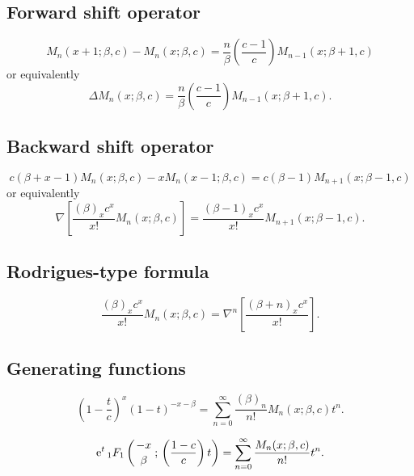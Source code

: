\documentclass[envcountchap,graybox]{svmono}
\newcommand{\hyp}[5]{\mbox{}_{#1}{F}_{#2}
\left(\genfrac{}{}{0pt}{}{#3}{#4}\,;\,#5\right)}
\newcommand{\e}{\textrm{e}}
\begin{document}
\subsection*{Forward shift operator}
\begin{equation}
\label{shift1MeixnerI}
M_n(x+1;\beta,c)-M_n(x;\beta,c)=
\frac{n}{\beta}\left(\frac{c-1}{c}\right)M_{n-1}(x;\beta+1,c)
\end{equation}
or equivalently
\begin{equation}
\label{shift1MeixnerII}
\Delta M_n(x;\beta,c)=\frac{n}{\beta}\left(\frac{c-1}{c}\right)M_{n-1}(x;\beta+1,c).
\end{equation}

\subsection*{Backward shift operator}
\begin{equation}
\label{shift2MeixnerI}
c(\beta+x-1)M_n(x;\beta,c)-xM_n(x-1;\beta,c)=c(\beta-1)M_{n+1}(x;\beta-1,c)
\end{equation}
or equivalently
\begin{equation}
\label{shift2MeixnerII}
\nabla\left[\frac{(\beta)_xc^x}{x!}M_n(x;\beta,c)\right]=
\frac{(\beta-1)_xc^x}{x!}M_{n+1}(x;\beta-1,c).
\end{equation}

\subsection*{Rodrigues-type formula}
\begin{equation}
\label{RodMeixner}
\frac{(\beta)_xc^x}{x!}M_n(x;\beta,c)=\nabla^n\left[\frac{(\beta+n)_xc^x}{x!}\right].
\end{equation}

\subsection*{Generating functions}
\begin{equation}
\label{GenMeixner1}
\left(1-\frac{t}{c}\right)^x(1-t)^{-x-\beta}=
\sum_{n=0}^{\infty}\frac{(\beta)_n}{n!}M_n(x;\beta,c)t^n.
\end{equation}

\begin{equation}
\label{GenMeixner2}
\e^t\,\hyp{1}{1}{-x}{\beta}{\left(\frac{1-c}{c}\right)t}=
\sum_{n=0}^{\infty}\frac{M_n(x;\beta,c)}{n!}t^n.
\end{equation}
\end{document}
